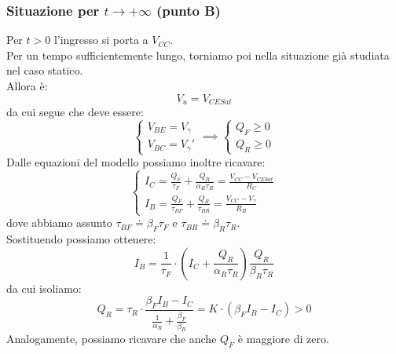 \documentclass{article}
\numberwithin{equation}{subsection}
\begin{document}
	\subsubsection{Situazione per $t \rightarrow +\infty$ (punto B)}
	Per $t > 0$ l'ingresso si porta a $V_{CC}$.\\
	Per un tempo sufficientemente lungo, torniamo poi nella situazione già studiata nel caso statico.\\
	Allora è:
	\[ V_u = V_{CESat} \]
	da cui segue che deve essere:
	\[ \begin{cases} V_{BE} = V_\gamma \\ V_{BC} = V_\gamma' \end{cases} \implies \begin{cases} Q_F \geq 0 \\ Q_R \geq 0 \end{cases} \]
	Dalle equazioni del modello possiamo inoltre ricavare:
	\[ \begin{cases} I_C = \frac{Q_F}{\tau_F} + \frac{Q_R}{\alpha_R \tau_R} = \frac{V_{CC} - V_{CESat}}{R_C} \\ I_B = \frac{Q_F}{\tau_{BF}} + \frac{Q_R}{\tau_{BR}} = \frac{V_{CC} - V_\gamma}{R_B} \end{cases} \]
	dove abbiamo assunto $\tau_{BF} \doteq \beta_F \tau_F$ e $\tau_{BR} \doteq \beta_R \tau_R$.\\
	Sostituendo possiamo ottenere:
	\[ I_B = \frac{1}{\tau_F} \cdot \left( I_C + \frac{Q_R}{\alpha_R \tau_R} \right)  \frac{Q_R}{\beta_R \tau_R} \] 
	da cui isoliamo: 
	\[ Q_R = \tau_R \cdot \frac{\beta_F I_B - I_C}{\frac{1}{\alpha_R} + \frac{\beta_F}{\beta_R}} = K \cdot (\beta_F I_B - I_C) > 0 \]
	Analogamente, possiamo ricavare che anche $Q_F$ è maggiore di zero.
\end{document}
